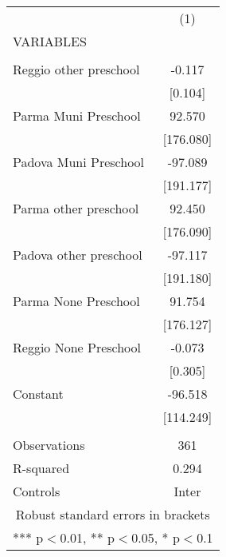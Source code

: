 \begin{tabular}{lc} \hline
 & (1) \\
VARIABLES &  \\ \hline
 &  \\
Reggio other preschool & -0.117 \\
 & [0.104] \\
Parma Muni Preschool & 92.570 \\
 & [176.080] \\
Padova Muni Preschool & -97.089 \\
 & [191.177] \\
Parma other preschool & 92.450 \\
 & [176.090] \\
Padova other preschool & -97.117 \\
 & [191.180] \\
Parma None Preschool & 91.754 \\
 & [176.127] \\
Reggio None Preschool & -0.073 \\
 & [0.305] \\
Constant & -96.518 \\
 & [114.249] \\
 &  \\
Observations & 361 \\
R-squared & 0.294 \\
 Controls & Inter \\ \hline
\multicolumn{2}{c}{ Robust standard errors in brackets} \\
\multicolumn{2}{c}{ *** p$<$0.01, ** p$<$0.05, * p$<$0.1} \\
\end{tabular}
